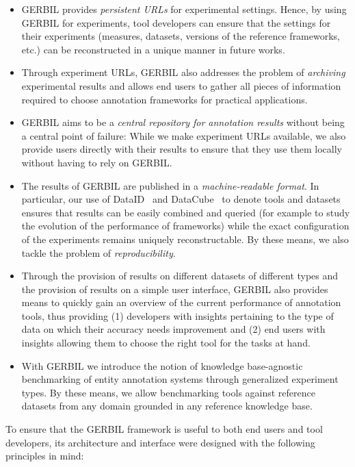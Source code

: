 \begin{itemize}
\item GERBIL provides \emph{persistent URLs} for experimental settings. Hence, by using GERBIL for experiments, tool developers can ensure that the settings for their experiments (measures, datasets, versions of the reference frameworks, etc.) can be reconstructed in a  unique manner in future works. 
\item Through experiment URLs, GERBIL also addresses the problem of \emph{archiving} experimental results and allows end users to gather all pieces of information required to choose annotation frameworks for practical applications.
\item GERBIL aims to be a \emph{central repository for annotation results} without being a central point of failure: While we make experiment URLs available, we also provide users directly with their results to ensure that they use them locally without having to rely on GERBIL.
\item The results of GERBIL are published in a \emph{machine-readable format}. In particular, our use of DataID~\cite{dataID} and DataCube~\cite{datacube} to denote tools and datasets ensures that results can be easily combined and queried (for example to study the evolution of the performance of frameworks) while the exact configuration of the experiments remains uniquely reconstructable. By these means, we also tackle the problem of \emph{reproducibility}. 
\item Through the provision of results on different datasets of different types and the provision of results on a simple user interface, GERBIL also provides means to quickly gain an overview of the current performance of annotation tools, thus providing (1) developers with insights pertaining to the type of data on which their accuracy needs improvement and (2) end users with insights allowing them to choose the right tool for the tasks at hand.
\item With GERBIL we introduce the notion of knowledge base-agnostic benchmarking of entity annotation systems through generalized experiment types. By these means, we allow benchmarking tools against reference datasets from any domain grounded in any reference knowledge base. 
\end{itemize}


To ensure that the GERBIL framework is useful to both end users and tool developers, its architecture and interface were designed with the following principles in mind:

